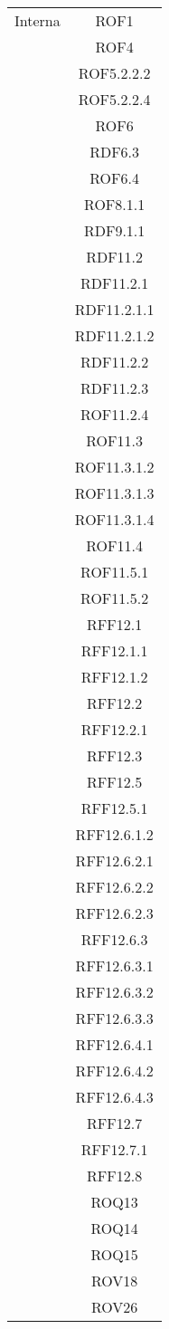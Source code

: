 \begin{longtable}{|c|c|}
\midrule
Interna
& ROF1\\
& ROF4\\
& ROF5.2.2.2\\
& ROF5.2.2.4\\
& ROF6\\
& RDF6.3\\
& ROF6.4\\
& ROF8.1.1\\
& RDF9.1.1\\
& RDF11.2\\
& RDF11.2.1\\
& RDF11.2.1.1\\
& RDF11.2.1.2\\
& RDF11.2.2\\
& RDF11.2.3\\
& ROF11.2.4\\
& ROF11.3\\
& ROF11.3.1.2\\
& ROF11.3.1.3\\
& ROF11.3.1.4\\
& ROF11.4\\
& ROF11.5.1\\
& ROF11.5.2\\
& RFF12.1\\
& RFF12.1.1\\
& RFF12.1.2\\
& RFF12.2\\
& RFF12.2.1\\
& RFF12.3\\
& RFF12.5\\
& RFF12.5.1\\
& RFF12.6.1.2\\
& RFF12.6.2.1\\
& RFF12.6.2.2\\
& RFF12.6.2.3\\
& RFF12.6.3\\
& RFF12.6.3.1\\
& RFF12.6.3.2\\
& RFF12.6.3.3\\
& RFF12.6.4.1\\
& RFF12.6.4.2\\
& RFF12.6.4.3\\
& RFF12.7\\
& RFF12.7.1\\
& RFF12.8\\
& ROQ13\\
& ROQ14\\
& ROQ15\\
& ROV18\\
& ROV26\\



\end{longtable}
